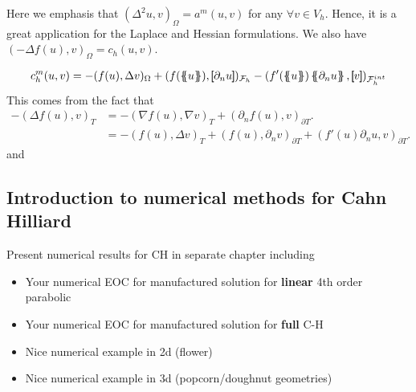 Here we emphasis that $( \Delta ^2 u, v)_\Omega  = a^{m}( u,v)   $ for any $\forall v \in V_{h}$. Hence, it is a great application for the Laplace and Hessian formulations. We also have $( -\Delta f( u) , v)_{\Omega } = c_{h}(u,v )   $.

\[
c^{m}_{h} ( u,v) = - ( f( u), \Delta v )_{ \Omega } + ( f( \mean{ u }  ), \jump{ \partial _{n} u }   )_{\mathcal{F}_{h} } - ( f' ( \mean{ u }  ) \mean{ \partial _{n}u }, \jump{ v }     )_{\mathcal{F}_{h} ^{int}}
\]
This comes from the fact that \[
    \begin{split}
-(\Delta f( u) , v)_{T } &= -(\nabla f( u), \nabla v  )_{T } + ( \partial _{n}  f( u), v )_{\partial T }.\\
                    & = -( f( u), \Delta v )_{T} + (f( u), \partial _{n} v  )_{\partial T} + (   f'( u)\partial _{n}u, v )_{\partial T } .
    \end{split}
\]
and


\subsection{Introduction to numerical methods for Cahn Hilliard}%
\label{sub:introduction_to_numerical_methods_for_cahn_hilliard}

Present numerical results for CH in separate chapter including
\begin{itemize}
    \item Your numerical EOC for  manufactured solution for \textbf{linear} 4th order parabolic
    \item Your numerical EOC for  manufactured solution for \textbf{full} C-H
    \item Nice numerical example in 2d (flower)
    \item Nice numerical example in 3d (popcorn/doughnut geometries)
\end{itemize}


